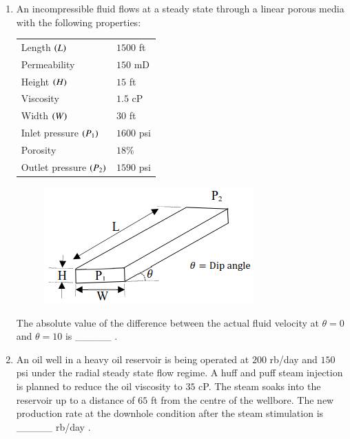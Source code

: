 \documentclass[journal,12pt,onecolumn]{IEEEtran}
\theoremstyle{remark}
\begin{document}
\begin{enumerate}
\hfill{}


\item An incompressible fluid  flows at a steady state through a linear porous media with the following properties:

\begin{tabular}{|l|l|}
\hline
Length $\left(L\right)$ & $1500$ ft \\
Permeability & $150$ mD \\
Height $\left(H\right)$ & $15$ ft \\
Viscosity & $1.5$ cP \\
Width $\left(W\right)$ & $30$ ft \\
Inlet pressure $\left(P_1\right)$ & $1600$ psi \\
Porosity & $18\%$ \\
Outlet pressure $\left(P_2\right)$ & $1590$ psi \\
\hline
\end{tabular}

\begin{figure}[h!]
  \centering
  \includegraphics[width=0.4\columnwidth]{figs/fig11.png} 
   \caption*{}
  \label{fig:Q48}
\end{figure}


The absolute value of the difference between the actual fluid velocity  at $\theta = 0$ and $\theta = 10$ is \_\_\_\_\_ .

\hfill{}

\pagebreak

\item An oil well  in a heavy oil reservoir  is being operated at $200$ rb/day and $150$ psi under the radial steady state flow regime. A huff and puff steam injection is planned to reduce the oil viscosity to $35$ cP. The steam soaks into the reservoir up to a distance of $65$ ft from the centre of the wellbore. The new production rate at the downhole condition after the steam stimulation is \_\_\_\_\_ rb/day .


\end{enumerate}
\end{document}
